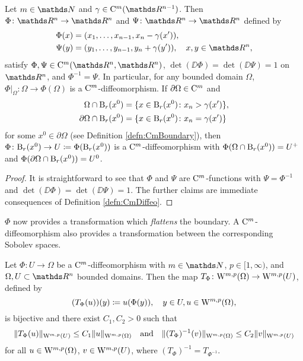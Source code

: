 \begin{lem}
  \label{lem:flattening}
  Let $m \in \N$ and $\gamma \in \CC^m(\R^{n - 1})$.
  Then $\Phi \colon \R^n \to \R^n$ and $\Psi \colon \R^n \to \R^n$ defined by
  \begin{align*}
    \Phi(x) &= (x_1,\dots,x_{n - 1}, x_n - \gamma(x')),\\
    \Psi(y) &= (y_1,\dots,y_{n - 1}, y_n + \gamma(y')), \quad x,y \in \R^n,
  \end{align*}
  satisfy $\Phi,\Psi \in \CC^m(\R^n,\R^n)$, $\det(\DD\Phi) = \det(\DD \Psi) =1$ on $\R^n$, and $\Phi^{-1} = \Psi$.
  In particular, for any bounded domain $\Omega$, $\Phi|_\Omega \colon \Omega \to \Phi(\Omega)$ is a $\mathrm{C}^m$\hyp{}diffeomorphism.
  If $\partial \Omega \in \mathrm{C}^m$ and 
  \begin{align*}
    \Omega \cap \mathrm{B}_r(x^0) &= \{ x \in \mathrm{B}_r(x^0) \colon x_n > \gamma(x')\},\\
    \partial \Omega \cap \mathrm{B}_r(x^0) &= \{ x \in \mathrm{B}_r(x^0) \colon x_n = \gamma(x')\}
  \end{align*}
  for some $x^0 \in \partial \Omega$ (see Definition \ref{defn:CmBoundary}), then $\Phi\colon \mathrm{B}_r(x^0) \to U \coloneqq \Phi(\mathrm{B}_r(x^0))$ is a $\mathrm{C}^m$\hyp{}diffeomorphism with $\Phi(\Omega \cap \mathrm{B}_r(x^0)) = U^+$ and $\Phi(\partial\Omega \cap \mathrm{B}_r(x^0)) = U^0$.
\end{lem}

\begin{proof}
  It is straightforward to see that $\Phi$ and $\Psi$ are $\mathrm{C}^m$-functions with $\Psi = \Phi^{-1}$ and $\det(\DD\Phi) = \det(\DD\Psi) = 1$.
  The further claims are immediate consequences of Definition \ref{defn:CmDiffeo}.
\end{proof}

$\Phi$ now provides a transformation which \emph{flattens} the boundary.
A $\mathrm{C}^m$\hyp{}diffeomorphism also provides a transformation between the corresponding Sobolev spaces.

\begin{prop}
  \label{prop:sobolevTransform}
  Let $\Phi \colon U \to \Omega$ be a $\mathrm{C}^m$\hyp{}diffeomorphism with $m \in \N$, $p \in [1,\infty)$, and $\Omega,U \subset \R^n$ bounded domains.
  Then the map $T_\Phi \colon \mathrm{W}^{m,p}(\Omega) \to \mathrm{W}^{m,p}(U)$, defined by
  $$
  (T_\Phi(u))(y) \coloneqq u(\Phi(y)), \quad y \in U, u \in \mathrm{W}^{m,p}(\Omega),
  $$
  is bijective and there exist $C_1, C_2 > 0$ such that
  $$
  \|T_\Phi(u)\|_{\mathrm{W}^{m,p}(U)} \leq C_1 \|u\|_{\mathrm{W}^{m,p}(\Omega)}
  \quad\text{and}\quad
  \|(T_\Phi)^{-1}(v)\|_{\mathrm{W}^{m,p}(\Omega)} \leq C_2 \|v\|_{\mathrm{W}^{m,p}(U)}
  $$
  for all $u \in \mathrm{W}^{m,p}(\Omega)$, $v \in \mathrm{W}^{m,p}(U)$, where $(T_\Phi)^{-1} = T_{\Phi^{-1}}$.
\end{prop}

